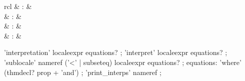 \begin{isabellebody}
\begin{isamarkuptext}
  \begin{matharray}{rcl}
    \hypertarget{command.interpretation}{\hyperlink{command.interpretation}{\mbox{}}} & : &  \\
    \hypertarget{command.interpret}{\hyperlink{command.interpret}{\mbox{}}} & : &  \\
    \hypertarget{command.sublocale}{\hyperlink{command.sublocale}{\mbox{}}} & : &  \\
    \hypertarget{command.print-interps}{\hyperlink{command.print-interps}{\mbox{}}} & : &  \\
  \end{matharray}

  \begin{rail}
    'interpretation' localeexpr equations?
    ;
    'interpret' localeexpr equations?
    ;
    'sublocale' nameref ('<' | subseteq) localeexpr equations?
    ;
    equations: 'where' (thmdecl? prop + 'and')
    ;
    'print_interps' nameref
    ;
  \end{rail}


\end{isamarkuptext}
\end{isabellebody}
